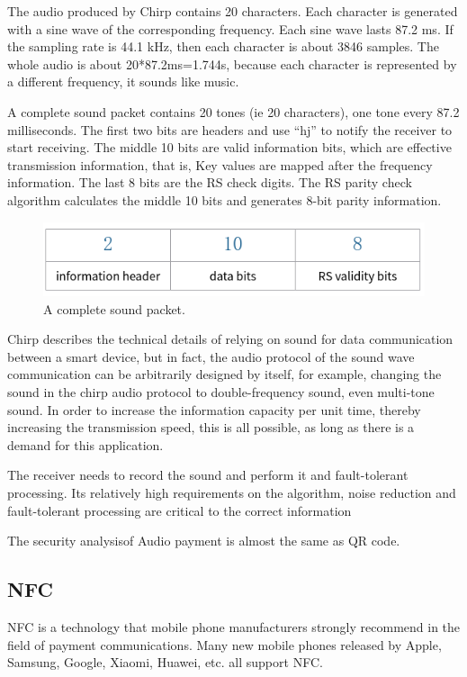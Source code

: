 \documentclass[journal]{IEEEtran}
\begin{document}
The audio produced by Chirp contains 20 characters. Each character is generated with a sine wave of the corresponding frequency. Each sine wave lasts 87.2 ms. If the sampling rate is 44.1 kHz, then each character is about 3846 samples. The whole audio is about 20*87.2ms=1.744s, because each character is represented by a different frequency, it sounds like music.

A complete sound packet contains 20 tones (ie 20 characters), one tone every 87.2 milliseconds. The first two bits are headers and use “hj” to notify the receiver to start receiving. The middle 10 bits are valid information bits, which are effective transmission information, that is, Key values are mapped after the frequency information. The last 8 bits are the RS check digits. The RS parity check algorithm calculates the middle 10 bits and generates 8-bit parity information.

\begin{figure}[htbp]
\centerline{\includegraphics[scale=0.4]{yinpinwei.png}}
\caption{A complete sound packet.}
\label{fig}
\end{figure}



Chirp describes the technical details of relying on sound for data communication between a smart device, but in fact, the audio protocol of the sound wave communication can be arbitrarily designed by itself, for example, changing the sound in the chirp audio protocol to double-frequency sound, even multi-tone sound. In order to increase the information capacity per unit time, thereby increasing the transmission speed, this is all possible, as long as there is a demand for this application.

The receiver needs to record the sound and perform it and fault-tolerant processing. Its relatively high requirements on the algorithm, noise reduction and fault-tolerant processing are critical to the correct information

The security analysisof Audio payment is almost the same as QR code.

\subsection{NFC}
NFC is a technology that mobile phone manufacturers strongly recommend in the field of payment communications. Many new mobile phones released by Apple, Samsung, Google, Xiaomi, Huawei, etc. all support NFC. 
\end{document}
